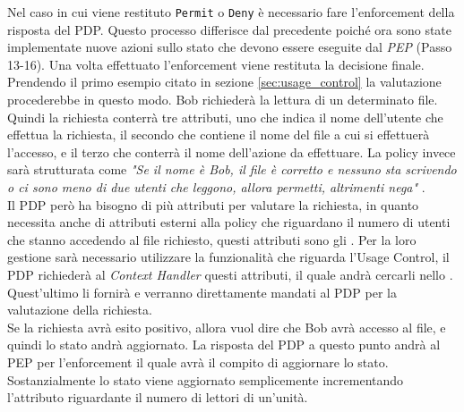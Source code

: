 Nel caso in cui viene restituto \texttt{Permit} o \texttt{Deny} è necessario fare l'enforcement della risposta del PDP. Questo processo differisce dal precedente poiché ora sono state implementate nuove azioni sullo stato che devono essere eseguite dal \textit{PEP} (Passo 13-16). Una volta effettuato l'enforcement viene restituta la decisione finale.\\
Prendendo il primo esempio citato in sezione \ref{sec:usage_control} la valutazione procederebbe in questo modo. Bob richiederà la lettura di un determinato file. Quindi la richiesta conterrà tre attributi, uno che indica il nome dell'utente che effettua la richiesta, il secondo che contiene il nome del file a cui si effettuerà l'accesso, e il terzo che conterrà il nome dell'azione da effettuare. La policy invece sarà strutturata come \textit{"Se il nome è Bob, il file è corretto e nessuno sta scrivendo o ci sono meno di due utenti che leggono, allora permetti, altrimenti nega" }.\\
Il PDP però ha bisogno di più attributi per valutare la richiesta, in quanto necessita anche di attributi esterni alla policy che riguardano il numero di utenti che stanno accedendo al file richiesto, questi attributi sono gli \statusattribute. Per la loro gestione sarà necessario utilizzare la funzionalità che riguarda l'Usage Control, il PDP richiederà al \textit{Context Handler} questi attributi, il quale andrà cercarli nello \status. Quest'ultimo li fornirà e verranno direttamente mandati al PDP per la valutazione della richiesta.\\
Se la richiesta avrà esito positivo, allora vuol dire che Bob avrà accesso al file, e quindi lo stato andrà aggiornato. La risposta del PDP a questo punto andrà al PEP per l'enforcement il quale avrà il compito di aggiornare lo stato. Sostanzialmente lo stato viene aggiornato semplicemente incrementando l'attributo riguardante il numero di lettori di un'unità.




